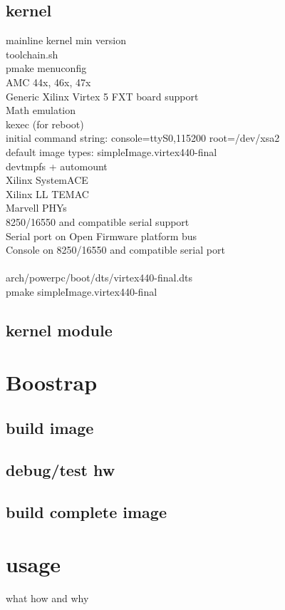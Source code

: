 \documentclass[11pt,technote,a4paper,onecolumn,dvips]{IEEEtran}
\begin{document}
\subsection{kernel}
mainline kernel min version\\%
toolchain.sh\\
pmake menuconfig\\
AMC 44x, 46x, 47x\\
Generic Xilinx Virtex 5 FXT board support\\
Math emulation\\
kexec (for reboot)\\
initial command string: console=ttyS0,115200 root=/dev/xsa2\\
default image types: simpleImage.virtex440-final\\ %
devtmpfs + automount\\
Xilinx SystemACE\\
Xilinx LL TEMAC\\
Marvell PHYs\\
8250/16550 and compatible serial support\\
Serial port on Open Firmware platform bus\\
Console on 8250/16550 and compatible serial port\\
\\
arch/powerpc/boot/dts/virtex440-final.dts\\
pmake simpleImage.virtex440-final %
\subsection{kernel module}
\section{Boostrap}
\subsection{build image}
\subsection{debug/test hw}
\subsection{build complete image}
\section{usage}
what how and why
\end{document}

